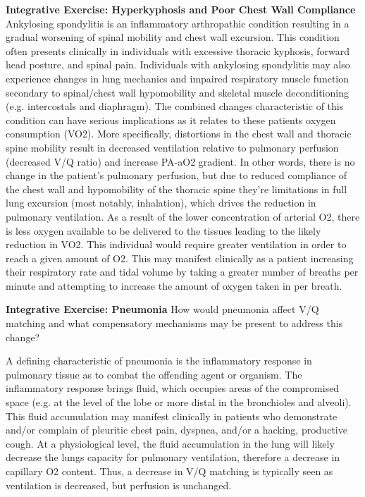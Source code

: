 {\begin{itemize}
\textbf{Integrative Exercise: Hyperkyphosis and Poor Chest Wall Compliance}
Ankylosing spondylitis is an inflammatory arthropathic condition resulting in a gradual worsening of spinal mobility and chest wall excursion. This condition often presents clinically in individuals with excessive thoracic kyphosis, forward head posture, and spinal pain. Individuals with ankylosing spondylitis may also experience changes in lung mechanics and impaired respiratory muscle function secondary to spinal/chest wall hypomobility and skeletal muscle deconditioning (e.g. intercostals and diaphragm). The combined changes characteristic of this condition can have serious implications as it relates to these patients oxygen consumption (VO2). More specifically, distortions in the chest wall and thoracic spine mobility result in decreased ventilation relative to pulmonary perfusion (decreased V/Q ratio) and increase PA-aO2 gradient. In other words, there is no change in the patient’s pulmonary perfusion, but due to reduced compliance of the chest wall and hypomobility of the thoracic spine they're limitations in full lung excursion (most notably, inhalation), which drives the reduction in pulmonary ventilation. As a result of the lower concentration of arterial O2, there is less oxygen available to be delivered to the tissues leading to the likely reduction in VO2. This individual would require greater ventilation in order to reach a given amount of O2. This may manifest clinically as a patient increasing their respiratory rate and tidal volume by taking a greater number of breaths per minute and attempting to increase the amount of oxygen taken in per breath.

\textbf{Integrative Exercise: Pneumonia}
How would pneumonia affect V/Q matching and what compensatory mechanisms may be present to address this change? 

A defining characteristic of pneumonia is the inflammatory response in pulmonary tissue as to combat the offending agent or organism. The inflammatory response brings fluid, which occupies areas of the compromised space (e.g. at the level of the lobe or more distal in the bronchioles and alveoli). This fluid accumulation may manifest clinically in patients who demonstrate and/or complain of pleuritic chest pain, dyspnea, and/or a hacking, productive cough. At a physiological level, the fluid accumulation in the lung will likely decrease the lungs capacity for pulmonary ventilation, therefore a decrease in capillary O2 content. Thus, a decrease in V/Q matching is typically seen as ventilation is decreased, but perfusion is unchanged. 



\end{itemize}}

